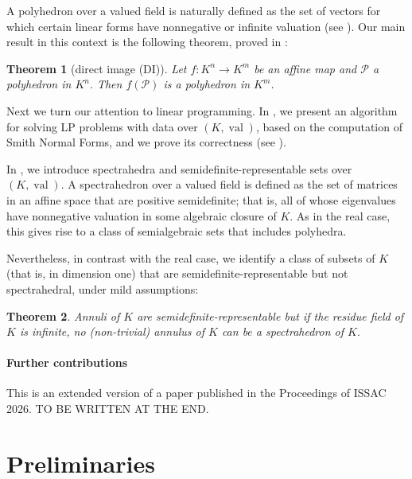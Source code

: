 \documentclass{elsarticle}
\theoremstyle{plain}
\newtheorem{theorem}{Theorem}[section]
\theoremstyle{definition}
\newcommand{\PP}{\mathcal{P}}
\DeclareMathOperator{\val}{val}
\begin{document}
A polyhedron over a valued field is naturally defined as the set of vectors for which certain
linear forms have nonnegative or infinite valuation (see ). Our main result in this
context is the following theorem, proved in :

\begin{theorem}[direct image (DI)] \label{theo:DI}
Let $f : K^n \to K^m$ be an affine map and $\PP$ a polyhedron in $K^n.$
Then $f(\PP)$ is a polyhedron in $K^m$.
\end{theorem}

Next we turn our attention to linear programming. In , we present
an algorithm for solving LP problems with data over $(K,\val)$, based on the computation of 
Smith Normal Forms, and we prove its correctness (see ).

In , we introduce spectrahedra and semidefinite-re\-pre\-sen\-ta\-ble sets
over $(K,\val)$. A spectrahedron over a valued field is defined as the set of matrices
in an affine space that are positive semidefinite; that is, all of whose eigenvalues
have nonnegative valuation in some algebraic closure of $K$. As in the real case, this gives rise
to a class of semialgebraic sets that includes polyhedra.

Nevertheless, in contrast with the real case, we identify a class of subsets of $K$
(that is, in dimension one) that are semidefinite-representable but not spectrahedral, 
under mild assumptions:

\begin{theorem}\label{main_2}
Annuli of $K$ are semidefinite-representable but if the residue field of $K$ is infinite, no (non-trivial) annulus of $K$ can be a spectrahedron of $K.$
\end{theorem}

\paragraph{Further contributions}
This is an extended version of a paper published in the Proceedings of ISSAC 2026.
TO BE WRITTEN AT THE END.


\section{Preliminaries}
\label{sec:prelim}
\end{document}
